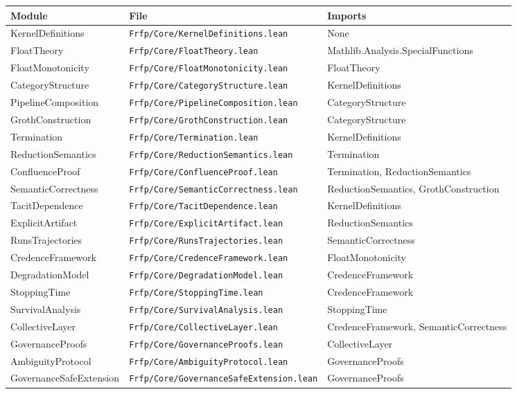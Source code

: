 \begin{center}
\begin{tabular}{lll}
\toprule
Module & File & Imports \\
\midrule
KernelDefinitions & \texttt{Frfp/Core/KernelDefinitions.lean} & None \\
FloatTheory & \texttt{Frfp/Core/FloatTheory.lean} & Mathlib.Analysis.SpecialFunctions \\
FloatMonotonicity & \texttt{Frfp/Core/FloatMonotonicity.lean} & FloatTheory \\
CategoryStructure & \texttt{Frfp/Core/CategoryStructure.lean} & KernelDefinitions \\
PipelineComposition & \texttt{Frfp/Core/PipelineComposition.lean} & CategoryStructure \\
GrothConstruction & \texttt{Frfp/Core/GrothConstruction.lean} & CategoryStructure \\
Termination & \texttt{Frfp/Core/Termination.lean} & KernelDefinitions \\
ReductionSemantics & \texttt{Frfp/Core/ReductionSemantics.lean} & Termination \\
ConfluenceProof & \texttt{Frfp/Core/ConfluenceProof.lean} & Termination, ReductionSemantics \\
SemanticCorrectness & \texttt{Frfp/Core/SemanticCorrectness.lean} & ReductionSemantics, GrothConstruction \\
TacitDependence & \texttt{Frfp/Core/TacitDependence.lean} & KernelDefinitions \\
ExplicitArtifact & \texttt{Frfp/Core/ExplicitArtifact.lean} & ReductionSemantics \\
RunsTrajectories & \texttt{Frfp/Core/RunsTrajectories.lean} & SemanticCorrectness \\
CredenceFramework & \texttt{Frfp/Core/CredenceFramework.lean} & FloatMonotonicity \\
DegradationModel & \texttt{Frfp/Core/DegradationModel.lean} & CredenceFramework \\
StoppingTime & \texttt{Frfp/Core/StoppingTime.lean} & CredenceFramework \\
SurvivalAnalysis & \texttt{Frfp/Core/SurvivalAnalysis.lean} & StoppingTime \\
CollectiveLayer & \texttt{Frfp/Core/CollectiveLayer.lean} & CredenceFramework, SemanticCorrectness \\
GovernanceProofs & \texttt{Frfp/Core/GovernanceProofs.lean} & CollectiveLayer \\
AmbiguityProtocol & \texttt{Frfp/Core/AmbiguityProtocol.lean} & GovernanceProofs \\
GovernanceSafeExtension & \texttt{Frfp/Core/GovernanceSafeExtension.lean} & GovernanceProofs \\
\bottomrule
\end{tabular}
\end{center}

